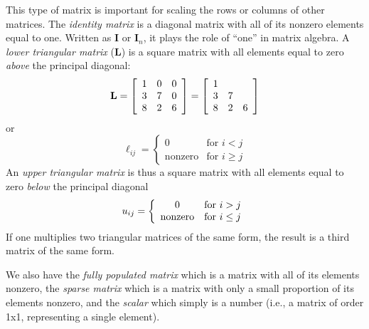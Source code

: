 This type of matrix is important for scaling the rows or columns of other matrices.  The \emph{identity 
matrix} is a diagonal matrix with all of its nonzero elements equal to one. Written as $\mathbf{I}$ or $\mathbf{I}_n$,
it plays the role of ``one'' in matrix algebra.
A \emph{lower triangular matrix} ($\mathbf{L}$) is a square 
matrix with all elements equal to zero \emph{above} the principal diagonal:
\begin{equation}
	\index{Matrix!lower triangular}
	\index{Lower triangular matrix}
\mathbf{L} = \left [ \begin{array}{ccc}
1 & 0 & 0 \\
3 & 7 & 0 \\
8 & 2 & 6
\end{array}
\right ] =
\left[ \begin{array}{ccc}
1 \\
3 & 7 \\
8 & 2 & 6 \end{array} \right]
\end{equation}
or
\begin{equation}
\ell_{ij} = \left \{ \begin{array}
{cl}
0 & \mbox{for } i < j\\
\mbox{nonzero} & \mbox{for } i \geq j 
\end{array} \right .
\end{equation}	 
An \emph{upper triangular matrix} is thus a square matrix with all elements equal to zero \emph{below} the principal 
diagonal
\begin{equation}
	\index{Matrix!upper triangular}
	\index{Upper triangular matrix}
u_{ij} = \left \{ \begin{array}{cl}
0 & \mbox{for } i > j\\
\mbox{nonzero} & \mbox{for } i \leq j 
\end{array} \right .
\end{equation}
If one multiplies two triangular matrices of the same form, the result is a third matrix of the same 
form.

	We also have the \emph{fully populated matrix} which is a matrix with all of its elements nonzero, 
the \emph{sparse matrix} which is a matrix with only a small proportion of its elements nonzero, and the \emph{scalar} 
which simply is a number (i.e., a matrix of order 1x1, representing a single element).

